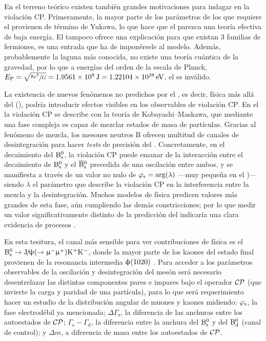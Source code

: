 En el terreno teórico existen también grandes motivaciones para indagar en la violación CP. 
Primeramente, la mayor parte de los parámetros de los que requiere el \stdmod provienen de término de Yukawa, lo que hace que el \stdmod parezca una teoría efectiva de baja energía. El \stdmod tampoco ofrece una explicación para que existan 3 familias de fermiones, es una entrada que ha de imponérsele al modelo. Además, probablemente la laguna más conocida, no existe una teoría cuántica de la gravedad, por lo que a energías del orden de la escala de Planck, $E_\mathrm{P} = \sqrt{\sfrac{\hbar c^5}{G}} =  1.9561\times10^{9} \, \mathrm{J} = 1.22104\times10^{28} \, \mathrm{eV}$, el \stdmod es inválido.


La existencia de nuevos fenómenos no predichos por el \stdmod, es decir, física más allá del \stdmod (\bstdmod), podría introducir efectos visibles en los observables de violación CP. En el \stdmod la violación CP se describe con la teoría de Kobayashi--Maskawa, que mediante una fase compleja es capaz de mezclar estados de masa de partículas.
Gracias al fenómeno de mezcla, los mesones neutros $\mathrm{B}$ ofrecen multitud de canales de desintegración para hacer \textit{tests} de precisión del  \stdmod.
Concretamente, en el decaimiento del $\text{B}{}_{\text{s}}^{\text{0}}$, la violación CP puede emanar de la interacción entre el decaimiento de $\text{B}{}_{\text{s}}^{\text{0}}$ y el $\overline{\text{B}}{}_{\text{s}}^{\text{0}}$  precedida de una oscilación entre ambos, y se manifiesta a través de un valor no nulo de $\varphi_{\text{s}} = \text{arg}(\lambda)$ ---muy pequeña en el \stdmod)--- siendo $\lambda$ el parámetro que describe la violación CP en la interferencia entre la mezcla y la desintegración.
Muchos modelos de física \bstdmod predicen valores más grandes de esta fase, aún cumpliendo las demás constricciones; por lo que medir un valor significativamente distinto de la predicción del \stdmod indicaría una clara evidencia de procesos \bstdmod.


En esta tesitura, el canal más sensible para ver contribuciones de física \bstdmod es el $\text{B}{}_{\text{s}}^{\text{0}} \rightarrow \text{J}\!/\!\uppsi(\rightarrow \upmu{}^{-} \upmu{}^{+}) \text{K}{}^{+}\text{K}{}^{-}$, donde la mayor parte de los kaones del estado final provienen de la resonancia intermedia $\upphi(1020)$ \cite{faller2009precision}. Para acceder a los parámetros observables de la oscilación y desintegración del mesón será necesario desentrelazar las distintas componentes pares e impares bajo el operador $\mathcal{CP}$ (que invierte la carga y paridad de una partícula), para lo que será requerimiento hacer un estudio de la distribución angular de muones y kaones midiendo: $\varphi_{\text{s}}$, la fase electrodébil ya mencionada;  $\Delta\Gamma_{\text{s}}$, la diferencia de las anchuras entre los autoestados de $\mathcal{CP}$; $\Gamma_{\text{s}}-\Gamma_{\text{d}}$, la diferencia entre la anchura del $\text{B}{}_{\text{s}}^{\text{0}}$ y del $\text{B}{}_{\text{d}}^{\text{0}}$ (canal de control); y $\Delta m$, a diferencia de masa entre los autoestados de $\mathcal{CP}$.


